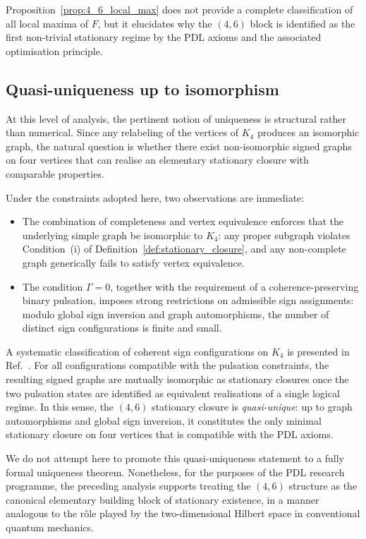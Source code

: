 \documentclass[11pt,a4paper]{article}
\theoremstyle{definition}
\begin{document}
Proposition~\ref{prop:4_6_local_max} does not provide a complete classification of all local maxima of $F$, but it elucidates why the $(4,6)$ block is identified as the first non-trivial stationary regime by the PDL axioms and the associated optimisation principle.\cite{PDL_Intro_2026,PDL_Main_2026}

\subsection{Quasi-uniqueness up to isomorphism}

At this level of analysis, the pertinent notion of uniqueness is structural rather than numerical. Since any relabeling of the vertices of $K_4$ produces an isomorphic graph, the natural question is whether there exist non-isomorphic signed graphs on four vertices that can realise an elementary stationary closure with comparable properties.\cite{PDL_Main_2026,Harary1953}

Under the constraints adopted here, two observations are immediate:
\begin{itemize}
  \item The combination of completeness and vertex equivalence enforces that the underlying simple graph be isomorphic to $K_4$: any proper subgraph violates Condition~(i) of Definition~\ref{def:stationary_closure}, and any non-complete graph generically fails to satisfy vertex equivalence.
  \item The condition $\Gamma=0$, together with the requirement of a coherence-preserving binary pulsation, imposes strong restrictions on admissible sign assignments: modulo global sign inversion and graph automorphisms, the number of distinct sign configurations is finite and small.\cite{PDL_Main_2026,PDL_Global_Mapping_2026}
\end{itemize}

A systematic classification of coherent sign configurations on $K_4$ is presented in Ref.~\cite{PDL_Main_2026}. For all configurations compatible with the pulsation constraints, the resulting signed graphs are mutually isomorphic as stationary closures once the two pulsation states are identified as equivalent realisations of a single logical regime.\cite{PDL_Main_2026} In this sense, the $(4,6)$ stationary closure is \emph{quasi-unique}: up to graph automorphisms and global sign inversion, it constitutes the only minimal stationary closure on four vertices that is compatible with the PDL axioms.

We do not attempt here to promote this quasi-uniqueness statement to a fully formal uniqueness theorem. Nonetheless, for the purposes of the PDL research programme, the preceding analysis supports treating the $(4,6)$ structure as the canonical elementary building block of stationary existence, in a manner analogous to the rôle played by the two-dimensional Hilbert space in conventional quantum mechanics.\cite{PDL_Main_2026,PDL_TO_Dialogue_2026}
\end{document}
